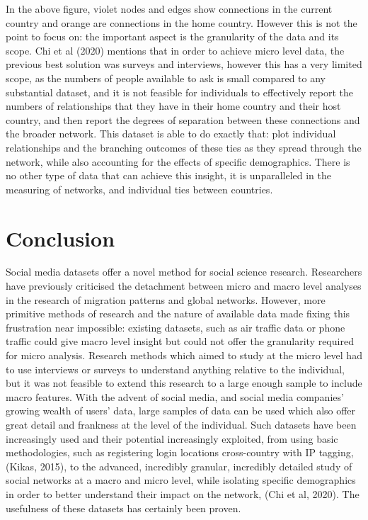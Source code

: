 \documentclass[12pt]{article}
\begin{document}
In the above figure, violet nodes and edges show connections in the current country and 
orange are connections in the home country. However this is not the point to focus on: 
the important aspect is the granularity of the data and its scope. Chi et al (2020) mentions 
that in order to achieve micro level data, the previous best solution was surveys and interviews, 
however this has a very limited scope, as the numbers of people available to ask is small 
compared to any substantial dataset, and it is not feasible for individuals to effectively 
report the numbers of relationships that they have in their home country and their host country, 
and then report the degrees of separation between these connections and the broader network. This 
dataset is able to do exactly that: plot individual relationships and the branching outcomes of  
these ties as they spread through the network, while also accounting for the effects of 
specific demographics. There is no other type of data that can achieve this insight, it is 
unparalleled in the measuring of networks, and individual ties between countries. 

\section{Conclusion}

Social media datasets offer a novel method for social science research. Researchers have 
previously criticised the detachment between micro and macro level analyses in 
the research of migration patterns and global networks. However, more primitive methods 
of research and the nature of available data made fixing this frustration near impossible:
existing datasets, such as air traffic data or phone traffic could give macro level insight
but could not offer the granularity required for micro analysis. Research methods which 
aimed to study at the micro level had to use interviews or surveys to understand 
anything relative to the individual, but it was not feasible to extend this research 
to a large enough sample to include macro features. With the advent of social media, and 
social media companies' growing wealth of users' data, large samples of data can be used 
which also offer great detail and frankness at the level of the individual. Such datasets 
have been increasingly used and their potential increasingly exploited, from using basic 
methodologies, such as registering login locations cross-country with IP tagging, (Kikas, 2015), 
to the advanced, incredibly granular, incredibly detailed study of social networks at a 
macro and micro level, while isolating specific demographics in order to better understand their 
impact on the network, (Chi et al, 2020). The usefulness of these datasets has certainly been 
proven. 
\end{document}
